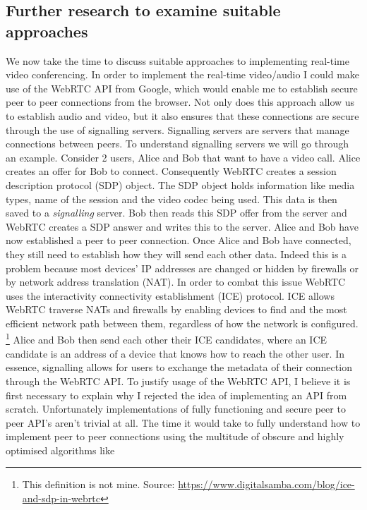 \subsection{Further research to examine suitable approaches}
\label{sec:further}

We now take the time to discuss suitable approaches to
implementing real-time video conferencing. In 
order to implement the real-time video/audio I could make use
of the WebRTC API from Google, which would enable me to 
establish secure peer to peer connections from the browser. 
Not only does this approach allow us to establish audio and 
video, but it also ensures that these connections are secure 
through the use of signalling servers. Signalling servers are
servers that manage connections between peers. To understand 
signalling servers we will go through an example. Consider 2 
users, Alice and Bob that want to have a video call. Alice 
creates an offer for Bob to connect. Consequently WebRTC 
creates a session description protocol (SDP) object. The SDP 
object holds information like media types, name of the
session and the video codec being used.  This data is then 
saved to a \textit{signalling} server. Bob then reads this SDP
offer from the server and WebRTC creates a SDP answer and
writes this to the server. Alice and Bob have now established 
a peer to peer connection. Once Alice and Bob have connected,
they still need to establish how they will send each other data.
Indeed this is a problem because most devices' IP addresses are
changed or hidden by firewalls or by network address translation 
(NAT). In order to combat this issue WebRTC uses the interactivity 
connectivity establishment (ICE) protocol. ICE allows WebRTC
traverse NATs and firewalls by enabling devices to find and 
the most efficient network path between them, regardless of
how the network is configured. \footnote{This definition is not mine. 
Source: \url{https://www.digitalsamba.com/blog/ice-and-sdp-in-webrtc}}
Alice and Bob then send each other their ICE candidates, where an ICE 
candidate is an address of a device that knows how to reach the 
other user. In essence, signalling allows for 
users to exchange the metadata of their connection through the
WebRTC API. To justify usage of the WebRTC API, I believe it 
is first necessary to explain why I rejected the idea of
implementing an API from scratch. Unfortunately
implementations of fully functioning and secure peer to peer
API's aren't trivial at all. The time it would take to fully
understand how to implement peer to peer connections using the
multitude of obscure and highly optimised algorithms like 
